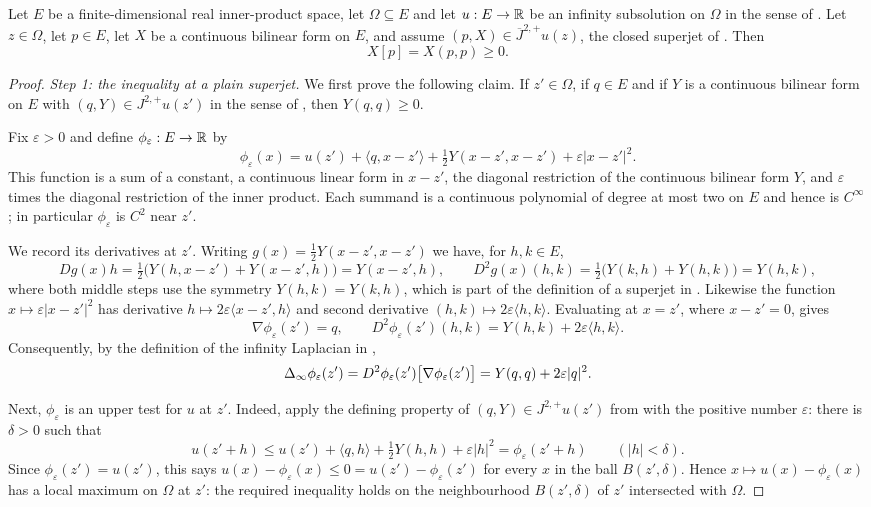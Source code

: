 \begin{lemma}
Let $E$ be a finite-dimensional real inner-product space, let $\Omega\subseteq E$
and let $u:E\to\mathbb{R}$ be an infinity subsolution on $\Omega$ in the sense of
. Let $z\in\Omega$, let $p\in E$, let $X$ be a
continuous bilinear form on $E$, and assume
$(p,X)\in\overline J^{2,+}u(z)$, the closed superjet of
. Then
\[
  X[p]=X(p,p)\ge0 .
\]
\end{lemma}
\begin{proof}
\emph{Step 1: the inequality at a plain superjet.}
We first prove the following claim. If $z'\in\Omega$, if $q\in E$ and if $Y$ is a
continuous bilinear form on $E$ with $(q,Y)\in J^{2,+}u(z')$ in the sense of
, then $Y(q,q)\ge0$.

Fix $\varepsilon>0$ and define $\phi_\varepsilon:E\to\mathbb{R}$ by
\[
  \phi_\varepsilon(x)=u(z')+\langle q,x-z'\rangle
     +\tfrac12Y(x-z',x-z')+\varepsilon|x-z'|^2 .
\]
This function is a sum of a constant, a continuous linear form in $x-z'$, the
diagonal restriction of the continuous bilinear form $Y$, and $\varepsilon$ times
the diagonal restriction of the inner product. Each summand is a continuous
polynomial of degree at most two on $E$ and hence is $C^\infty$; in particular
$\phi_\varepsilon$ is $C^2$ near $z'$.

We record its derivatives at $z'$. Writing $g(x)=\tfrac12Y(x-z',x-z')$ we have,
for $h,k\in E$,
\[
  Dg(x)h=\tfrac12\bigl(Y(h,x-z')+Y(x-z',h)\bigr)=Y(x-z',h),
  \qquad
  D^2g(x)(h,k)=\tfrac12\bigl(Y(k,h)+Y(h,k)\bigr)=Y(h,k),
\]
where both middle steps use the symmetry $Y(h,k)=Y(k,h)$, which is part of the
definition of a superjet in . Likewise the function
$x\mapsto\varepsilon|x-z'|^2$ has derivative $h\mapsto2\varepsilon\langle
x-z',h\rangle$ and second derivative $(h,k)\mapsto2\varepsilon\langle h,k\rangle$.
Evaluating at $x=z'$, where $x-z'=0$, gives
\[
  \nabla\phi_\varepsilon(z')=q,
  \qquad
  D^2\phi_\varepsilon(z')(h,k)=Y(h,k)+2\varepsilon\langle h,k\rangle .
\]
Consequently, by the definition of the infinity Laplacian in ,
\begin{equation}\label{eq:iscs-inflap}
  \Delta_{\infty}\phi_\varepsilon(z')
    =D^2\phi_\varepsilon(z')\bigl[\nabla\phi_\varepsilon(z')\bigr]
    =Y(q,q)+2\varepsilon|q|^2 .
\end{equation}

Next, $\phi_\varepsilon$ is an upper test for $u$ at $z'$. Indeed, apply the
defining property of $(q,Y)\in J^{2,+}u(z')$ from  with the
positive number $\varepsilon$: there is $\delta>0$ such that
\[
  u(z'+h)\le u(z')+\langle q,h\rangle+\tfrac12Y(h,h)+\varepsilon|h|^2
    =\phi_\varepsilon(z'+h)
  \qquad(|h|<\delta).
\]
Since $\phi_\varepsilon(z')=u(z')$, this says
$u(x)-\phi_\varepsilon(x)\le0=u(z')-\phi_\varepsilon(z')$ for every $x$ in the
ball $B(z',\delta)$. Hence $x\mapsto u(x)-\phi_\varepsilon(x)$ has a local
maximum on $\Omega$ at $z'$: the required inequality holds on the neighbourhood
$B(z',\delta)$ of $z'$ intersected with $\Omega$.


\end{proof}
